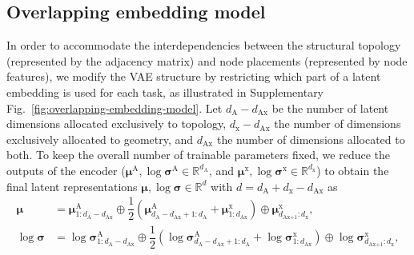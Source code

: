\documentclass[fleqn,10pt]{wlscirep}
\begin{document}
\subsection{Overlapping embedding model}
\label{subsec:overlapping-embedding-model}

In order to accommodate the interdependencies between the structural topology (represented by the adjacency matrix) and node placements (represented by node features), we modify the VAE structure by restricting which part of a latent embedding is used for each task, as illustrated in Supplementary Fig.~\ref{fig:overlapping-embedding-model}. Let $d_{\text{A}} - d_{\text{Ax}}$ be the number of latent dimensions allocated exclusively to topology, $d_{\text{x}} - d_{\text{Ax}}$ the number of dimensions exclusively allocated to geometry, and $d_{\text{Ax}}$ the number of dimensions allocated to both. To keep the overall number of trainable parameters fixed, we reduce the outputs of the encoder ($\boldsymbol{\mu}^{\text{A}}, \log\boldsymbol{\sigma}^{\text{A}} \in \mathbb{R}^{d_{\text{A}}} $, and $\boldsymbol{\mu}^{\text{x}}, \log\boldsymbol{\sigma}^{\text{x}} \in \mathbb{R}^{d_{\text{x}}}$) to obtain the final latent representations $\boldsymbol{\mu}, \log\boldsymbol{\sigma} \in \mathbb{R}^{d} $ with $ d = d_{\text{A}} + d_{\text{x}} - d_{\text{Ax}}$ as
\begin{align}
    \boldsymbol{\mu} &= \boldsymbol{\mu}^{\text{A}}_{1:d_{\text{A}}-d_{\text{Ax}}} \oplus \dfrac{1}{2}\left(\boldsymbol{\mu}^{\text{A}}_{d_{\text{A}}-d_{\text{Ax}}+1:d_{\text{A}}} + \boldsymbol{\mu}^{\text{x}}_{1:d_{\text{Ax}}}\right) \oplus \boldsymbol{\mu}^{\text{x}}_{d_{\text{Ax+1}}:d_{\text{x}}},\\
    \log\boldsymbol{\sigma} & = \log\boldsymbol{\sigma}^{\text{A}}_{1:d_{\text{A}}-d_{\text{Ax}}} \oplus \dfrac{1}{2}\left(\log\boldsymbol{\sigma}^{\text{A}}_{d_{\text{A}}-d_{\text{Ax}}+1:d_{\text{A}}} + \log\boldsymbol{\sigma}^{\text{x}}_{1:d_{\text{Ax}}}\right) \oplus \log\boldsymbol{\sigma}^{\text{x}}_{d_{\text{Ax+1}}:d_{\text{x}}},
\end{align}
\end{document}
